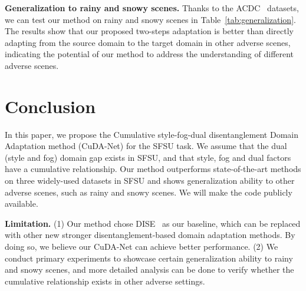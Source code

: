 \documentclass[10pt,twocolumn,letterpaper]{article}
\newcommand{\heading}[1]{\noindent\textbf{#1}}
\begin{document}
\noindent\textbf{Generalization to rainy and snowy scenes.} Thanks to the ACDC~\cite{ACDC} datasets, we can test our method on rainy and snowy scenes in Table~\ref{tab:generalization}. The results show that our proposed two-steps adaptation is better than directly adapting from the source domain to the target domain in other adverse scenes, indicating the potential of our method to address the understanding of different adverse scenes.
















\section{Conclusion}
In this paper, we propose the Cumulative style-fog-dual disentanglement Domain Adaptation method (CuDA-Net) for the SFSU task.
We assume that the dual (style and fog) domain gap exists in SFSU, and that style, fog and dual factors have a cumulative relationship. 
Our method outperforms state-of-the-art methods on three widely-used datasets in SFSU and shows generalization ability to other adverse scenes, such as rainy and snowy scenes. 
We will make the code publicly available.


\heading{Limitation.}
(1) Our method chose DISE~\cite{chang2019all} as our baseline, which can be replaced with other new stronger disentanglement-based domain adaptation methods. By doing so, we believe our CuDA-Net can achieve better performance.
(2) We conduct primary experiments to showcase certain generalization ability to rainy and snowy scenes, and more detailed analysis can be done to verify whether the cumulative relationship exists in other adverse settings.






{\small


}
\end{document}
